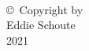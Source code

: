 
\thispagestyle{empty}
\hbox{\ }

\vfill

\vspace{.5in}

\begin{center}
\large{\copyright \hbox{ }Copyright by\\
Eddie Schoute  %
\\
2021}
\end{center}

\vfill

\newpage 
